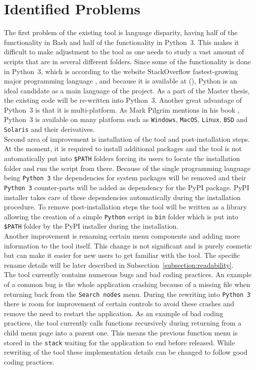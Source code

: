 \section{Identified Problems}
\label{section:improvement}
The first problem of the existing tool is language disparity, having half of the functionality in Bash and half of the functionality in Python~3. This makes it difficult to make adjustment to the tool as one needs to study a vast amount of scripts that are in several different folders. Since some of the functionality is done in Python~3, which is according to the website StackOverflow fastest-growing major programming language \cite{pythonfastestgrowing}, and because it is available at  (), Python is an ideal candidate as a main language of the project. As a part of the Master thesis, the existing code will be re-written into Python~3. Another great advantage of Python~3 is that it is multi-platform. As Mark Pilgrim mentions in his book \cite{Pilgrimc2010}, Python~3 is available on many platform such as \texttt{Windows}, \texttt{MacOS}, \texttt{Linux}, \texttt{BSD} and \texttt{Solaris} and their derivatives.\\
Second area of improvement is installation of the tool and post-installation steps. At the moment, it is required to install additional packages and the tool is not automatically put into \texttt{\$PATH} folders forcing its users to locate the installation folder and run the script from there. Because of the single programming language being \texttt{Python~3} the dependencies for system packages will be removed and their \mbox{\texttt{Python~3}} counter-parts will be added as dependency for the PyPI package. PyPI installer takes care of these dependencies automatically during the installation procedure. To remove post-installation steps the tool will be written as a library allowing the creation of a simple \texttt{Python} script in \texttt{bin} folder which is put into \texttt{\$PATH} folder by the PyPI installer during the installation.\\
Another improvement is renaming certain menu components and adding more information to the tool itself. This change is not significant and is purely cosmetic but can make it easier for new users to get familiar with the tool. The specific rename details will be later described in Subsection~\ref{subsection:readability}.\\
The tool currently contains numerous bugs and bad coding practices. An example of a common bug is the whole application crashing because of a missing file when returning back from the \texttt{Search nodes} menu. During the rewriting into \texttt{Python~3} there is room for improvement of certain controls to avoid these crashes and remove the need to restart the application. As an example of bad coding practices, the tool currently calls functions recursively during returning from a child menu page into a parent one. This means the previous function menu is stored in the \texttt{stack} waiting for the application to end before released. While rewriting of the tool these implementation details can be changed to follow good coding practices.